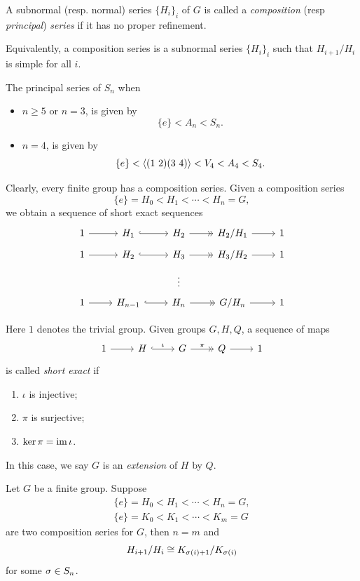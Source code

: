 \begin{definition}
  A subnormal (resp. normal) series \(\{H_i\}_i\) of \(G\) is called a \emph{composition} (resp \emph{principal}) \emph{series} if it has no proper refinement.
\end{definition}
Equivalently, a composition series is a subnormal series \(\{H_i\}_i\) such that \(H_{i+1}/H_i\) is simple for all \(i\).

\begin{example}
  The principal series of \(S_n\) when \begin{itemize}
    \item \(n \geq 5\) or \(n = 3\), is given by \[
      \{e\} < A_n < S_n.
    \]
    \item \(n = 4\), is given by \[
    \{e\} < \<(1\ 2)(3\ 4)\> < V_4 < A_4 < S_4.
  \]
  \end{itemize}
\end{example}

Clearly, every finite group has a composition series. Given a composition series \[
  \{e\} = H_0 < H_1 < \cdots < H_n = G,
\] we obtain a sequence of short exact sequences \[
  \begin{tikzcd}[row sep=tiny]
    1 \ar{r} & H_1 \ar[hook]{r} & H_2 \ar[->>]{r} & H_2/H_1 \ar{r} & 1 \\
    1 \ar{r} & H_2 \ar[hook]{r} & H_3 \ar[->>]{r} & H_3/H_2 \ar{r} & 1 \\
    & & \vdots \\
    1 \ar{r} & H_{n-1} \ar[hook]{r} & H_n \ar[->>]{r} & G/H_n \ar{r} & 1
  \end{tikzcd}
\]

Here \(1\) denotes the trivial group. Given groups \(G, H, Q\), a sequence of maps \[
  \begin{tikzcd}
    1 \ar{r} & H \ar[hook]{r}{\iota} & G \ar[->>]{r}{\pi} & Q \ar{r} & 1
  \end{tikzcd}
\] is called \emph{short exact} if \begin{enumerate}
  \item \(\iota\) is injective;
  \item \(\pi\) is surjective;
  \item \(\ker\pi = \operatorname{im}\iota\).
\end{enumerate} In this case, we say \(G\) is an \emph{extension} of \(H\) by \(Q\).

\begin{theorem}
  Let \(G\) be a finite group. Suppose \begin{align*}
    \{e\} = H_0 < H_1 < \cdots < H_n = G, \\
    \{e\} = K_0 < K_1 < \cdots < K_m = G
  \end{align*} are two composition series for \(G\), then \(n = m\) and \[
    H_{i+1}/H_i \cong K_{\sigma(i)+1}/K_{\sigma(i)}
  \] for some \(\sigma\in S_n\).
\end{theorem}

